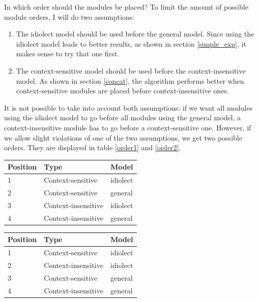 \documentclass[12pt]{article}
\let\originaltable\table
\let\endoriginaltable\endtable
\renewenvironment{table}[1][ht]{%
  \originaltable[#1]
  \centering}%
  {\endoriginaltable}
\begin{document}
In which order should the modules be placed? To limit the amount of possible module orders, I will do two assumptions:

\begin{enumerate}

\item The idiolect model should be used before the general model. Since using the idiolect model leads to better results, as shown in section \ref{simple_exp}, it makes sense to try that one first.
\item The context-sensitive model should be used before the context-insensitive model. As shown in section \ref{concat}, the algorithm performs better when context-sensitive modules are placed before context-insensitive ones.

\end{enumerate}

It is not possible to take into account both assumptions: if we want all modules using the idiolect model to go before all modules using the general model, a context-insensitive module has to go before a context-sensitive one. However, if we allow slight violations of one of the two assumptions, we get two possible orders. They are displayed in table \ref{order1} and \ref{order2}. 

\begin{table}[H]
\begin{tabular}{lll} 
Position&Type&Model\\
\hline
1&Context-sensitive&idiolect\\
2&Context-sensitive&general\\
3&Context-insensitive&idiolect\\
4&Context-insensitive&general\\
\end{tabular} 
\caption{Module order with the general model as background model, version 1} \label{order1}
\end{table}

\begin{table}[H]
\begin{tabular}{lll} 
Position&Type&Model\\
\hline
1&Context-sensitive&idiolect\\
2&Context-insensitive&idiolect\\
3&Context-sensitive&general\\
4&Context-insensitive&general\\
\end{tabular} 
\caption{Module order with the general model as backgroun model, version 2} \label{order2}
\end{table}
\end{document}
